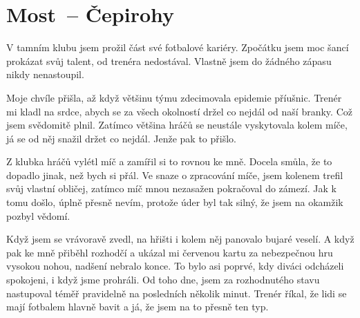 
\chapter{Most~-- Čepirohy}

V tamním klubu jsem prožil část své fotbalové kariéry. Zpočátku jsem moc šancí
prokázat svůj talent, od trenéra nedostával. Vlastně jsem do žádného zápasu
nikdy nenastoupil.

Moje chvíle přišla, až když většinu týmu zdecimovala epidemie příušnic. Trenér
mi kladl na srdce, abych se za všech okolností držel co nejdál od naší branky.
Což jsem svědomitě plnil. Zatímco většina hráčů se neustále vyskytovala kolem
míče, já se od něj snažil držet co nejdál. Jenže pak to přišlo.

Z klubka hráčů vylétl míč a zamířil si to rovnou ke mně. Docela smůla, že to
dopadlo jinak, než bych si přál. Ve snaze o zpracování míče, jsem kolenem
trefil svůj vlastní obličej, zatímco míč mnou nezasažen pokračoval do zámezí.
Jak k tomu došlo, úplně přesně nevím, protože úder byl tak silný, že jsem na
okamžik pozbyl vědomí.

Když jsem se vrávoravě zvedl, na hřišti i kolem něj panovalo bujaré veselí. A
když pak ke mně přiběhl rozhodčí a ukázal mi červenou kartu za nebezpečnou hru
vysokou nohou, nadšení nebralo konce. To bylo asi poprvé, kdy diváci odcházeli
spokojeni, i když jsme prohráli. Od toho dne, jsem za rozhodnutého stavu
nastupoval téměř pravidelně na posledních několik minut. Trenér říkal, že lidi
se mají fotbalem hlavně bavit a já, že jsem na to přesně ten typ.


